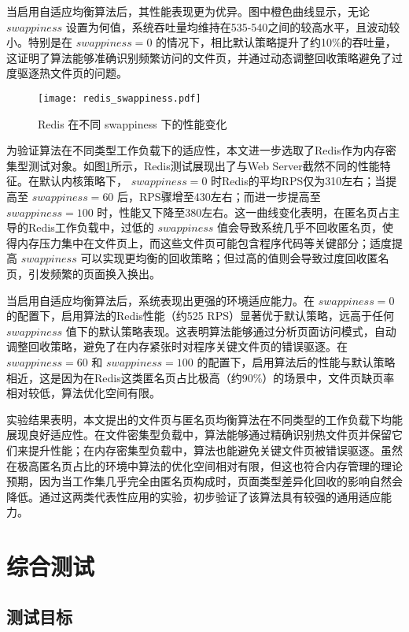 当启用自适应均衡算法后，其性能表现更为优异。图中橙色曲线显示，无论 \(swappiness\) 设置为何值，系统吞吐量均维持在535-540之间的较高水平，且波动较小。特别是在 \(swappiness =0\) 的情况下，相比默认策略提升了约10\%的吞吐量，这证明了算法能够准确识别频繁访问的文件页，并通过动态调整回收策略避免了过度驱逐热文件页的问题。

\begin{figure}[htbp]
    \centering
    \texttt{[image: redis\_swappiness.pdf]}
    \caption{Redis 在不同  swappiness  下的性能变化}
    \label{fig:redis_swappiness}
\end{figure}

为验证算法在不同类型工作负载下的适应性，本文进一步选取了Redis作为内存密集型测试对象。如图\ref{fig:redis_swappiness}所示，Redis测试展现出了与Web Server截然不同的性能特征。在默认内核策略下， \(swappiness =0\) 时Redis的平均RPS仅为310左右；当提高至 \(swappiness =60\) 后，RPS骤增至430左右；而进一步提高至 \(swappiness =100\) 时，性能又下降至380左右。这一曲线变化表明，在匿名页占主导的Redis工作负载中，过低的 \(swappiness\) 值会导致系统几乎不回收匿名页，使得内存压力集中在文件页上，而这些文件页可能包含程序代码等关键部分；适度提高 \(swappiness\) 可以实现更均衡的回收策略；但过高的值则会导致过度回收匿名页，引发频繁的页面换入换出。

当启用自适应均衡算法后，系统表现出更强的环境适应能力。在 \(swappiness =0\) 的配置下，启用算法的Redis性能（约525 RPS）显著优于默认策略，远高于任何 \(swappiness\) 值下的默认策略表现。这表明算法能够通过分析页面访问模式，自动调整回收策略，避免了在内存紧张时对程序关键文件页的错误驱逐。在 \(swappiness =60\) 和 \(swappiness =100\) 的配置下，启用算法后的性能与默认策略相近，这是因为在Redis这类匿名页占比极高（约90\%）的场景中，文件页缺页率相对较低，算法优化空间有限。

实验结果表明，本文提出的文件页与匿名页均衡算法在不同类型的工作负载下均能展现良好适应性。在文件密集型负载中，算法能够通过精确识别热文件页并保留它们来提升性能；在内存密集型负载中，算法也能避免关键文件页被错误驱逐。虽然在极高匿名页占比的环境中算法的优化空间相对有限，但这也符合内存管理的理论预期，因为当工作集几乎完全由匿名页构成时，页面类型差异化回收的影响自然会降低。通过这两类代表性应用的实验，初步验证了该算法具有较强的通用适应能力。

\section{综合测试}

\subsection{测试目标}

